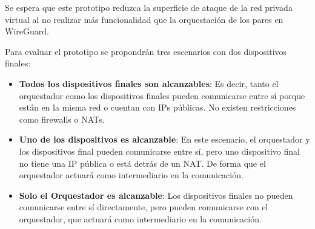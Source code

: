 Se espera que este prototipo reduzca la superficie de ataque de la red privada virtual al no realizar más funcionalidad que la orquestación de los pares en WireGuard. 


Para evaluar el prototipo se propondrán tres escenarios con dos dispositivos finales:
\begin{itemize}
    \item \textbf{Todos los dispositivos finales son alcanzables}: Es decir, tanto el orquestador como los dispositivos finales pueden comunicarse entre sí porque están en la misma red o cuentan con IPs públicas. No existen restricciones como firewalls o NATs.
    
    \item \textbf{Uno de los dispositivos es alcanzable}: En este escenario, el orquestador y los dispositivos final pueden comunicarse entre sí, pero uno dispositivo final no tiene una IP pública o está detrás de un NAT. De forma que el orquestador actuará como intermediario en la comunicación.
    
    \item \textbf{Solo el Orquestador es alcanzable}: Los dispositivos finales no pueden comunicarse entre sí directamente, pero pueden comunicarse con el orquestador, que actuará como intermediario en la comunicación.
\end{itemize}
